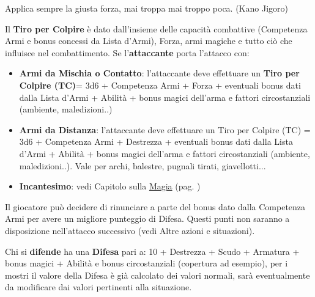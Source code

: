 \begin{enfasi}{Applica sempre la giusta forza, mai troppa mai troppo poca. (Kano Jigoro)}\end{enfasi}

\begin{multicols}{2}

Il \textbf{Tiro per Colpire} è dato dall'insieme delle capacità combattive (Competenza Armi e bonus concessi da Lista d'Armi), Forza, armi magiche e tutto ciò che influisce nel combattimento. Se l'\textbf{attaccante} porta l'attacco con:

\begin{itemize}[leftmargin=*] \setlength{\itemsep}{0pt}
\item \textbf{Armi da Mischia o Contatto}: l'attaccante deve effettuare un \textbf{Tiro per Colpire (TC)}= 3d6 + Competenza Armi + Forza + eventuali bonus dati dalla Lista d'Armi + Abilità + bonus magici dell'arma e fattori circostanziali (ambiente, maledizioni..)

\item
\textbf{Armi da Distanza}: l'attaccante deve effettuare un Tiro per Colpire (TC) = 3d6 + Competenza Armi + Destrezza + eventuali bonus dati dalla Lista d'Armi + Abilità + bonus magici dell'arma e fattori circostanziali (ambiente, maledizioni..). Vale per archi, balestre, pugnali tirati, giavellotti...

\item
\textbf{Incantesimo}: vedi Capitolo sulla \hyperlink{magietiropercolpireconlemagie}{Magia} (pag. \pageref{magietiropercolpireconlemagie})
\end{itemize}

Il giocatore può decidere di rinunciare a parte del bonus dato dalla Competenza Armi per avere un migliore punteggio di Difesa. Questi punti non saranno a disposizione nell'attacco successivo (vedi Altre azioni e situazioni).





Chi si \textbf{difende} ha una \textbf{Difesa} pari a: 10 + Destrezza + Scudo + Armatura + bonus magici + Abilità e bonus circostanziali (copertura ad esempio), per i mostri il valore della Difesa è già calcolato dei valori normali, sarà eventualmente da modificare dai valori pertinenti alla situazione.


\end{multicols}
